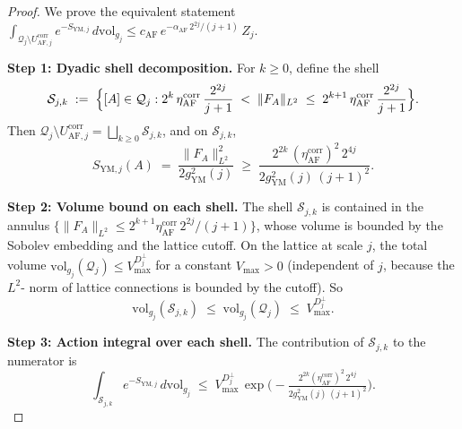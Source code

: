 \begin{proof}
We prove the equivalent statement
$\int_{\mathcal{Q}_{j}\setminus U_{\mathrm{AF},j}^{\mathrm{corr}}}
e^{-S_{\mathrm{YM},j}}\,d\mathrm{vol}_{g_{j}}\le c_{\mathrm{AF}}\,
e^{-\alpha_{\mathrm{AF}}\,2^{2j}/(j+1)}\,Z_{j}$.

\textbf{Step 1: Dyadic shell decomposition.} For $k\ge 0$, define the
shell
\begin{equation}
\label{eq:shell}
  \mathcal{S}_{j,k}\;:=\;\Bigl\{[A]\in\mathcal{Q}_{j}:
  2^{k}\,\eta_{\mathrm{AF}}^{\mathrm{corr}}\,\frac{2^{2j}}{j+1}
  \;<\;\|F_{A}\|_{L^{2}}\;\le\;
  2^{k+1}\,\eta_{\mathrm{AF}}^{\mathrm{corr}}\,\frac{2^{2j}}{j+1}
  \Bigr\}.
\end{equation}
Then $\mathcal{Q}_{j}\setminus U_{\mathrm{AF},j}^{\mathrm{corr}}
=\bigsqcup_{k\ge 0}\mathcal{S}_{j,k}$, and on $\mathcal{S}_{j,k}$,
\begin{equation}
\label{eq:shell_action}
  S_{\mathrm{YM},j}(A)\;=\;\frac{\|F_{A}\|_{L^{2}}^{2}}{2g_{
  \mathrm{YM}}^{2}(j)}
  \;\ge\;\frac{2^{2k}\,(\eta_{\mathrm{AF}}^{\mathrm{corr}})^{2}\,
  2^{4j}}{2g_{\mathrm{YM}}^{2}(j)\,(j+1)^{2}}.
\end{equation}

\textbf{Step 2: Volume bound on each shell.} The shell
$\mathcal{S}_{j,k}$ is contained in the annulus
$\{\|F_{A}\|_{L^{2}}\le 2^{k+1}\eta_{\mathrm{AF}}^{\mathrm{corr}}\,
2^{2j}/(j+1)\}$, whose volume is bounded by the Sobolev embedding
and the lattice cutoff. On the lattice at scale $j$, the total volume
$\mathrm{vol}_{g_{j}}(\mathcal{Q}_{j})\le V_{\max}^{D_{j}^{\perp}}$
for a constant $V_{\max}>0$ (independent of $j$, because the $L^{2}$-
norm of lattice connections is bounded by the cutoff). So
\begin{equation}
\label{eq:shell_vol}
  \mathrm{vol}_{g_{j}}(\mathcal{S}_{j,k})
  \;\le\;\mathrm{vol}_{g_{j}}(\mathcal{Q}_{j})
  \;\le\;V_{\max}^{D_{j}^{\perp}}.
\end{equation}

\textbf{Step 3: Action integral over each shell.} The contribution of
$\mathcal{S}_{j,k}$ to the numerator is
\begin{equation}
\label{eq:shell_integral}
  \int_{\mathcal{S}_{j,k}}e^{-S_{\mathrm{YM},j}}\,d\mathrm{vol}_{
  g_{j}}
  \;\le\;V_{\max}^{D_{j}^{\perp}}\,
  \exp\!\bigl(-\tfrac{2^{2k}(\eta_{\mathrm{AF}}^{\mathrm{corr}})^{2}
  \,2^{4j}}{2g_{\mathrm{YM}}^{2}(j)\,(j+1)^{2}}\bigr).
\end{equation}


\end{proof}
